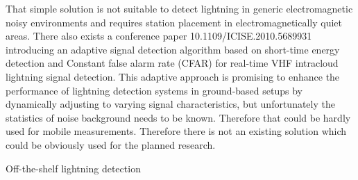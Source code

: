 That simple solution is not suitable to detect lightning in generic electromagnetic noisy environments and requires station placement in electromagnetically quiet areas. There also exists a conference paper 10.1109/ICISE.2010.5689931 introducing an adaptive signal detection algorithm based on short-time energy detection and Constant false alarm rate (CFAR) for real-time VHF intracloud lightning signal detection. This adaptive approach is promising to enhance the performance of lightning detection systems in ground-based setups by dynamically adjusting to varying signal characteristics, but unfortunately the statistics of noise background needs to be known. Therefore that could be hardly used for mobile measurements. Therefore there is not an existing solution which could be obviously used for the planned research.

 Off-the-shelf lightning detection

